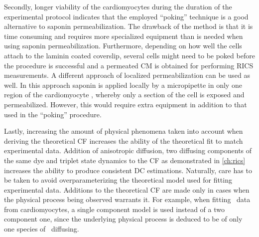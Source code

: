 Secondly, longer viability of the cardiomyocytes during the duration of
the experimental protocol indicates that the employed ``poking''
technique is a good alternative to saponin permeabilization. The
drawback of the method is that it is time consuming and requires more
specialized equipment than is needed when using saponin permeabilization.
Furthermore, depending on how well the cells attach to the laminin
coated coverslip, several cells might need to be poked before the
procedure is successful and a permeated \ac{CM} is obtained for
performing \ac{RICS} measurements. A different approach of localized
permeabilization can be used as well. In this approach saponin is applied locally by a
micropipette in only one region of the cardiomyocyte
\cite{Abraham_02_JBiolChem_277_p24427}, whereby only a
section of the cell is exposed and permeabilized. However, this would
require extra equipment in addition to that used in the ``poking'' procedure. 

Lastly, increasing the amount of physical phenomena taken into account when deriving the
theoretical \acl{CF} increases the ability of the
theoretical fit to match experimental data. Addition of anisotropic
diffusion, two diffusing components of the same dye and triplet state
dynamics to the \ac{CF} as demonstrated in \ref{ch:rics} increases the ability
to produce consistent \ac{DC} estimations. Naturally, care has to be
taken to avoid overparameterizing the theoretical model used for fitting
experimental data. Additions to the theoretical \ac{CF} are made only in
cases when the physical process being observed warrants it. For example,
when fitting \DEX\ data from cardiomyocytes, a single component model is
used instead of a two component one, since the underlying physical process is deduced
to be of only one species of \DEX\ diffusing. 


